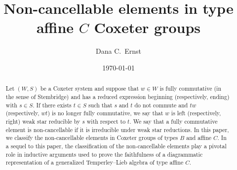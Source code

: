 \documentclass[12pt]{amsart}
\date{\today}
\title[Non-cancellable elements in type affine $C$ Coxeter groups]{Non-cancellable elements in type \\ affine $C$ Coxeter groups}
\author{Dana C.~Ernst}
\renewcommand{\(}{\left(}
\renewcommand{\)}{\right)}
\begin{document}
\begin{abstract}
Let $(W,S)$ be a Coxeter system and suppose that $w \in W$ is fully commutative (in the sense of Stembridge) and has a reduced expression beginning (respectively, ending) with $s \in S$.  If there exists $t\in S$ such that $s$ and $t$ do not commute and $tw$ (respectively, $wt$) is no longer fully commutative, we say that $w$ is left (respectively, right) weak star reducible by $s$ with respect to $t$.  We say that a fully commutative element is non-cancellable if it is irreducible under weak star reductions.  In this paper, we classify the non-cancellable elements in Coxeter groups of types $B$ and affine $C$.  In a sequel to this paper, the classification of the non-cancellable elements play a pivotal role in inductive arguments used to prove the faithfulness of a diagrammatic representation of a generalized Temperley--Lieb algebra of type affine $C$.
\end{abstract}

\maketitle

\end{document}
